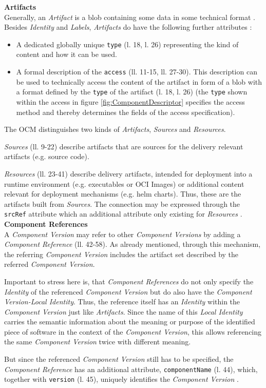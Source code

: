 \noindent\textbf{Artifacts}\\
Generally, an \emph{Artifact} is a blob containing some data in some technical format \cite{OCMSpec}. Besides \emph{Identity} and \emph{Labels}, \emph{Artifacts} do have the following further attributes \cite{OCMSpec}:
\begin{itemize}
\item A dedicated globally unique \lstinline|type| (l. 18, l. 26) representing the kind of content and how it can be used.
\item A formal description of the \lstinline|access| (ll. 11-15, ll. 27-30). This description can be used to technically access the content of the artifact in form of a blob with a format defined by the \lstinline|type| of the artifact (l. 18, l. 26) (the \lstinline|type| shown within the access in figure \ref{fig:ComponentDescriptor} specifies the access method and thereby determines the fields of the access specification).
\end{itemize}
The OCM distinguishes two kinds of \emph{Artifacts}, \emph{Sources} and \emph{Resources}.\par
\emph{Sources} (ll. 9-22) describe artifacts that are sources for the delivery relevant artifacts (e.g. source code).\par
\emph{Resources} (ll. 23-41) describe delivery artifacts, intended for deployment into a runtime environment (e.g. executables or OCI Images) or additional content relevant for deployment mechanisms (e.g. helm charts). Thus, these are the artifacts built from \emph{Sources}. The connection may be expressed through the \lstinline|srcRef| attribute which an additional attribute only existing for \emph{Resources} \cite{OCMSpec}.\\

\noindent\textbf{Component References}\\
A \emph{Component Version} may refer to other \emph{Component Versions} by adding a \emph{Component Reference} (ll. 42-58). As already mentioned, through this mechanism, the referring \emph{Component Version} includes the artifact set described by the referred \emph{Component Version}.\par
Important to stress here is, that \emph{Component References} do not only specify the \emph{Identity} of the referenced \emph{Component Version} but do also have the \emph{Component Version-Local Identity}. Thus, the reference itself has an \emph{Identity} within the \emph{Component Version} just like \emph{Artifacts}. Since the name of this \emph{Local Identity} carries the semantic information about the meaning or purpose of the identified piece of software in the context of the \emph{Component Version}, this allows referencing the same \emph{Component Version} twice with different meaning.\par
But since the referenced \emph{Component Version} still has to be specified, the \emph{Component Reference} has an additional attribute, \lstinline|componentName| (l. 44), which, together with \lstinline|version| (l. 45), uniquely identifies the \emph{Component Version} \cite{OCMSpec}.\\

